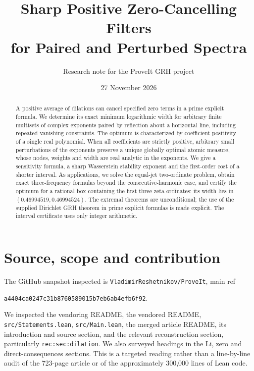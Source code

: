 \documentclass[11pt]{article}
\title{Sharp Positive Zero-Cancelling Filters\\for Paired and Perturbed Spectra}
\author{Research note for the ProveIt GRH project}
\date{27 November 2026}
\theoremstyle{remark}\newtheorem{remark}[theorem]{Remark}
\begin{document}
\maketitle
\begin{abstract}
A positive average of dilations can cancel specified zero terms in a prime explicit formula. We determine its exact minimum logarithmic width for arbitrary finite multisets of complex exponents paired by reflection about a horizontal line, including repeated vanishing constraints. The optimum is characterized by coefficient positivity of a single real polynomial. When all coefficients are strictly positive, arbitrary small perturbations of the exponents preserve a unique globally optimal atomic measure, whose nodes, weights and width are real analytic in the exponents. We give a sensitivity formula, a sharp Wasserstein stability exponent and the first-order cost of a shorter interval. As applications, we solve the equal-jet two-ordinate problem, obtain exact three-frequency formulas beyond the consecutive-harmonic case, and certify the optimum for a rational box containing the first three zeta ordinates: its width lies in $(0.46994519,0.46994524)$. The extremal theorems are unconditional; the use of the supplied Dirichlet GRH theorem in prime explicit formulas is made explicit. The interval certificate uses only integer arithmetic.
\end{abstract}
\tableofcontents

\section{Source, scope and contribution}
The GitHub snapshot inspected is \texttt{VladimirReshetnikov/ProveIt}, main ref
\begin{center}\small\texttt{a4404ca0247c31b8760589015b7eb6ab4efb6f92}.\end{center}
We inspected the vendoring README, the vendored README, \texttt{src/Statements.lean}, \texttt{src/Main.lean}, the merged article README, its introduction and source section, and the relevant reconstruction section, particularly \texttt{rec:sec:dilation}. We also surveyed headings in the Li, zero and direct-consequences sections. This is a targeted reading rather than a line-by-line audit of the 723-page article or of the approximately 300,000 lines of Lean code.
\end{document}
